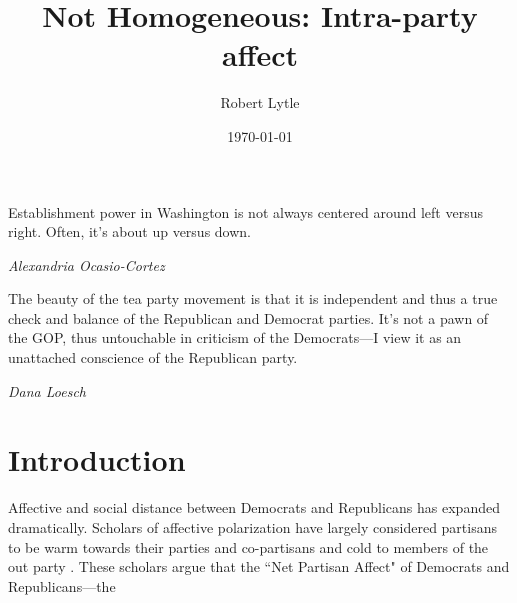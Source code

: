 \documentclass[12pt]{paper}
\begin{document}
\title{Not Homogeneous: Intra-party affect}
\author{Robert Lytle}
\date{\today}
\maketitle
\epigraph{Establishment power in Washington is not always centered around left versus right. Often, it’s about up versus down.}{\textit{Alexandria Ocasio-Cortez}}
\epigraph{The beauty of the tea party movement is that it is independent and thus a true check and balance of the Republican and Democrat parties. It's not a pawn of the GOP, thus untouchable in criticism of the Democrats---I view it as an unattached conscience of the Republican party.}{\textit{Dana Loesch}}



\section{Introduction}
Affective and social distance between Democrats and Republicans has expanded dramatically. Scholars of affective polarization have largely considered partisans to be warm towards their parties and co-partisans and cold to members of the out party \citep{iyengar2012affect, iyengar2018strengthening}. These scholars argue that the ``Net Partisan Affect" of Democrats and Republicans---the
\end{document}
